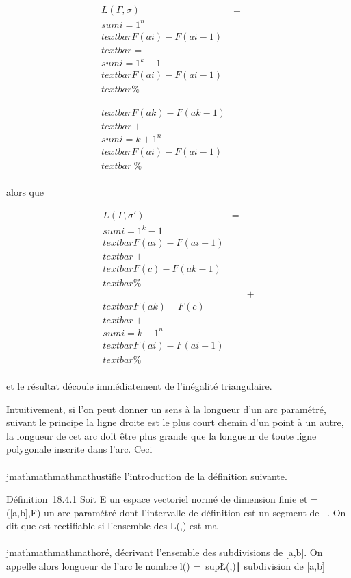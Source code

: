 \begin{align*} L(\Gamma,\sigma)& =&
\\sum
i=1^n\\textbar{}F(a i) -
F(ai-1)\\textbar{} =
\\sum
i=1^k-1\\textbar{}F(a i) -
F(ai-1)\\textbar{}\%&
\\ & &
+\\textbar{}F(ak) -
F(ak-1)\\textbar{} +
\\sum
i=k+1^n\\textbar{}F(a i) -
F(ai-1)\\textbar{}\ \%&
\\ \end{align*}

alors que

\begin{align*} L(\Gamma,\sigma')& =&
\\sum
i=1^k-1\\textbar{}F(a i) -
F(ai-1)\\textbar{} +\\textbar{}
F(c) - F(ak-1)\\textbar{}\%&
\\ & &
+\\textbar{}F(ak) -
F(c)\\textbar{} + \\sum
i=k+1^n\\textbar{}F(a i) -
F(ai-1)\\textbar{}\%&
\\ \end{align*}

et le résultat découle immédiatement de l'inégalité triangulaire.

Intuitivement, si l'on peut donner un sens à la longueur d'un arc
paramétré, suivant le principe la ligne droite est le plus court chemin
d'un point à un autre, la longueur de cet arc doit être plus grande que
la longueur de toute ligne polygonale inscrite dans l'arc. Ceci \\\\jmathmathmathmathustifie
l'introduction de la définition suivante.

Définition~18.4.1 Soit E un espace vectoriel normé de dimension finie et
\Gamma = ({[}a,b{]},F) un arc paramétré dont l'intervalle de définition est
un segment de ~. On dit que \Gamma est rectifiable si l'ensemble des L(\Gamma,\sigma)
est ma\\\\jmathmathmathmathoré, \sigma décrivant l'ensemble des subdivisions de {[}a,b{]}. On
appelle alors longueur de l'arc \Gamma le nombre l(\Gamma)
=\
sup\L(\Gamma,\sigma)∣\sigma\text
subdivision de {[}a,b{]}\.

